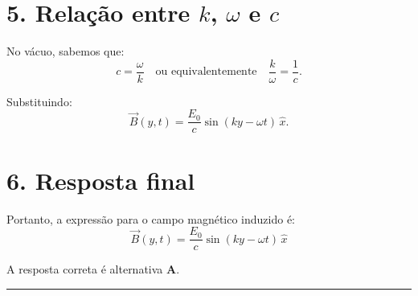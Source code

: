 \begin{flushleft}
\section*{5. Relação entre \(k\), \(\omega\) e \(c\)}

No vácuo, sabemos que:
\[
c = \frac{\omega}{k} \quad \text{ou equivalentemente} \quad \frac{k}{\omega} = \frac{1}{c}.
\]

Substituindo:
\[
\vec{B}(y,t) = \frac{E_0}{c} \sin(k y - \omega t) \, \hat{x}.
\]

\section*{6. Resposta final}

Portanto, a expressão para o campo magnético induzido é:
\[
\boxed{
\vec{B}(y,t) = \frac{E_0}{c} \sin(k y - \omega t) \, \hat{x}
}
\]


A resposta correta é alternativa \colorbox{green!50}{\textbf{A}}.
\end{flushleft}

\noindent\rule{\linewidth}{0.6pt}\\

